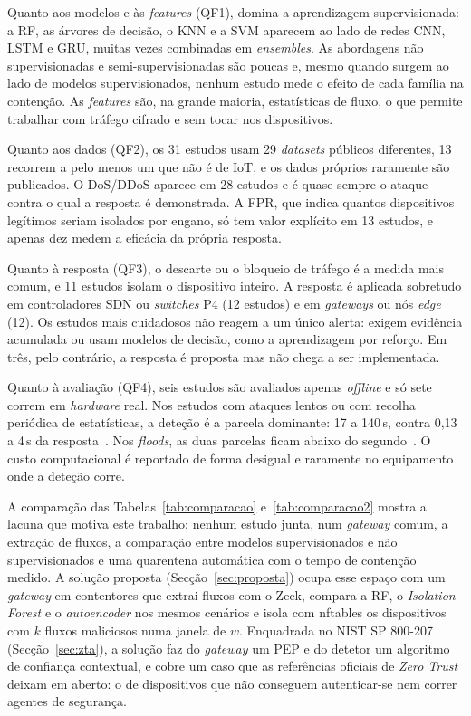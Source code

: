 \documentclass[conference,a4paper]{IEEEtran}
\begin{document}
Quanto aos modelos e às \textit{features} (QF1), domina a aprendizagem supervisionada: a
RF, as árvores de decisão, o KNN e a SVM aparecem ao lado de redes CNN, LSTM e GRU,
muitas vezes combinadas em \textit{ensembles}. As abordagens não supervisionadas e
semi-supervisionadas são poucas e, mesmo quando surgem ao lado de modelos
supervisionados, nenhum estudo mede o efeito de cada família na contenção. As
\textit{features} são, na grande maioria, estatísticas de fluxo, o que permite trabalhar
com tráfego cifrado e sem tocar nos dispositivos.

Quanto aos dados (QF2), os 31 estudos usam 29 \textit{datasets} públicos diferentes, 13
recorrem a pelo menos um que não é de IoT, e os dados próprios raramente são publicados.
O DoS/DDoS aparece em 28 estudos e é quase sempre o ataque contra o qual a resposta é
demonstrada. A FPR, que indica quantos dispositivos legítimos seriam isolados por engano,
só tem valor explícito em 13 estudos, e apenas dez medem a eficácia da própria resposta.

Quanto à resposta (QF3), o descarte ou o bloqueio de tráfego é a medida mais comum, e 11
estudos isolam o dispositivo inteiro. A resposta é aplicada sobretudo em controladores
SDN ou \textit{switches} P4 (12 estudos) e em \textit{gateways} ou nós \textit{edge} (12).
Os estudos mais cuidadosos não reagem a um único alerta: exigem evidência acumulada ou
usam modelos de decisão, como a aprendizagem por reforço. Em três, pelo contrário, a
resposta é proposta mas não chega a ser implementada.

Quanto à avaliação (QF4), seis estudos são avaliados apenas \textit{offline} e só sete
correm em \textit{hardware} real. Nos estudos com ataques lentos ou com recolha periódica de
estatísticas, a deteção é a parcela dominante: 17 a 140\,s, contra 0,13 a 4\,s da
resposta~\cite{karam2025isaaf,andrade2024ddos,ramirezmartinez2025p4}. Nos
\textit{floods}, as duas parcelas ficam abaixo do
segundo~\cite{toony2024multiblock,kponyo2020lightweight}. O custo computacional é reportado de forma desigual e
raramente no equipamento onde a deteção corre.

A comparação das Tabelas~\ref{tab:comparacao} e~\ref{tab:comparacao2} mostra a lacuna
que motiva este trabalho: nenhum estudo junta, num \textit{gateway} comum, a extração de
fluxos, a comparação entre modelos supervisionados e não supervisionados e uma quarentena
automática com o tempo de contenção medido. A solução proposta
(Secção~\ref{sec:proposta}) ocupa esse espaço com um \textit{gateway} em contentores que
extrai fluxos com o Zeek, compara a RF, o \textit{Isolation Forest} e o
\textit{autoencoder} nos mesmos cenários e isola com nftables os dispositivos com $k$
fluxos maliciosos numa janela de $w$. Enquadrada no NIST SP 800-207
(Secção~\ref{sec:zta}), a solução faz do \textit{gateway} um PEP e do detetor um
algoritmo de confiança contextual, e cobre um caso que as referências oficiais de
\textit{Zero Trust} deixam em aberto: o de dispositivos que não conseguem autenticar-se
nem correr agentes de segurança.
\end{document}
